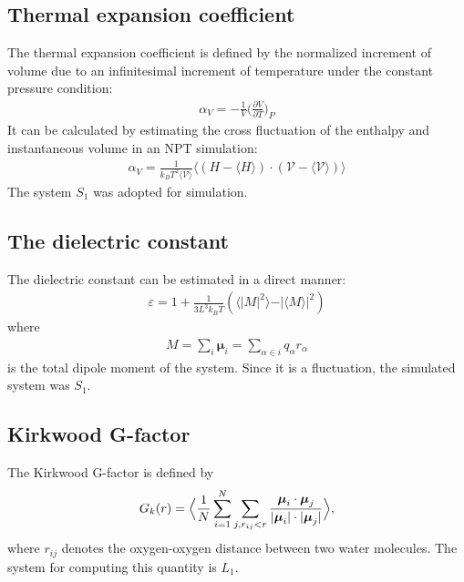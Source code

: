 \documentclass[a4paper,preprint,unsortedaddress,onecolumn,fleqn]{revtex4}
\newcommand{\systemsb}{S_1}
\begin{document}
\subsection{Thermal expansion coefficient}

The thermal expansion coefficient is defined by the normalized increment of
volume due to an infinitesimal increment of temperature under the constant
pressure condition: 
\begin{align}
\alpha_V = - \frac 1V \Big(\frac{\partial V}{\partial T}\Big)_P
\end{align}
It can be calculated by estimating the cross fluctuation of the enthalpy and
instantaneous volume in an NPT simulation: 
\begin{align}
\alpha_V = \frac{1}{k_BT^2\langle \mathcal{V}\rangle} \langle (H - \langle
H\rangle)\cdot(\mathcal{V }- \langle \mathcal{V}\rangle) \rangle
\end{align}
The system $S_1$ was adopted for simulation.

\subsection{The dielectric constant}

The dielectric constant can be estimated in a direct manner: 
\begin{align}
\varepsilon = 1 + \frac{1}{3L^3 k_BT} ( \langle \vert \mathbf{\mathit{M}}%
\vert^2\rangle - \vert\langle \mathbf{\mathit{M}}\rangle\vert^2 )
\end{align}
where 
\begin{align}
\mathbf{\mathit{M }} = \sum_i\boldsymbol{\mu}_i = \sum_{\alpha\in i} q_\alpha%
\mathbf{\mathit{r}}_\alpha
\end{align}
is the total dipole moment of the system. Since it is a fluctuation, the
simulated system was $S_1$. 

\subsection{Kirkwood G-factor}

The Kirkwood G-factor is defined by~\cite{vanderSpoel2006origin} 
\begin{align}
G_k(r) = \Big\langle \frac 1N \sum_{i=1}^N \sum_{j, r_{ij} < r} \frac {%
\boldsymbol{\mu}_i \cdot \boldsymbol{\mu}_j}{\vert \boldsymbol{\mu}_i\vert
\cdot \vert\boldsymbol{\mu}_j\vert} \Big\rangle,
\end{align}
where $r_{ij}$ denotes the oxygen-oxygen distance between two water
molecules. The system for computing this quantity is $L_1$.
\end{document}
